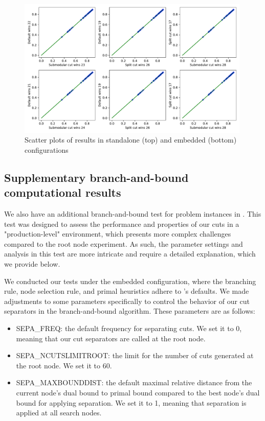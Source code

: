 \begin{figure}[h]
    \centering
    \includegraphics[width=0.99\textwidth]{Chaptersub/media/scatter_dopt.pdf}
    \caption{Scatter plots of \bdopt results in standalone (top) and embedded (bottom) configurations}
    \label{fig:dopt}
\end{figure}



\subsection{Supplementary branch-and-bound computational results}
\label{sec.appb}
We also have an additional branch-and-bound test for \maxcut problem instances in . This test was designed to assess the performance and properties of our cuts in a "production-level" environment, which presents more complex challenges compared to the root node experiment. As such, the parameter settings and analysis in this test are more intricate and require a detailed explanation, which we provide below.

We conducted our tests under the embedded configuration, where the branching rule, node selection rule, and primal heuristics adhere to \scip's defaults. We made adjustments to some parameters specifically to control the behavior of our cut separators in the branch-and-bound algorithm. These parameters are as follows:
\begin{itemize}
	\item SEPA\_FREQ:  the default frequency for separating cuts. We set it to 0, meaning that our cut separators are called at the root node.
	\item SEPA\_NCUTSLIMITROOT: the limit for the number of cuts generated  at the root node. We  set it to 60.
	\item SEPA\_MAXBOUNDDIST: the default maximal relative distance from the current node's dual bound to primal bound compared to the best node's dual bound for applying separation. We set it to 1, meaning that separation is applied at all search nodes.
\end{itemize}


